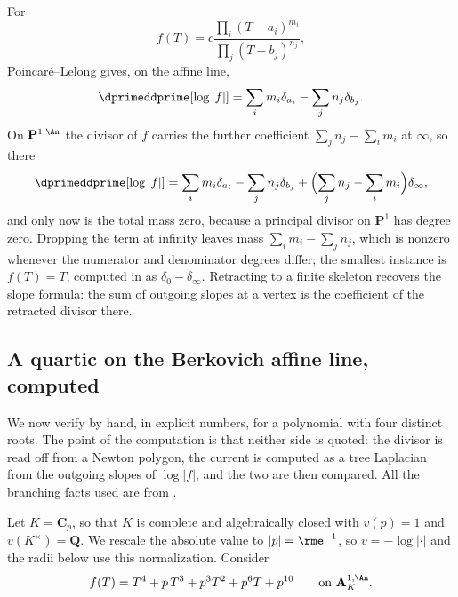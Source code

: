 \begin{example}
\label{ex:ch15-rational-p1}
For
\[
                    f(T)=c\frac{\prod_i(T-a_i)^{m_i}}
                                  {\prod_j(T-b_j)^{n_j}},
\]
Poincar\'e--Lelong gives, on the affine line,
\[
 \dprimeddprime[\log|f|]
       =\sum_i m_i\delta_{a_i}-\sum_jn_j\delta_{b_j}.
\]
On $\mathbf P^{1,\An}$ the divisor of $f$ carries the further coefficient
$\sum_jn_j-\sum_im_i$ at $\infty$, so there
\[
 \dprimeddprime[\log|f|]
       =\sum_i m_i\delta_{a_i}-\sum_jn_j\delta_{b_j}
        +\Bigl(\sum_jn_j-\sum_im_i\Bigr)\delta_\infty ,
\]
and only now is the total mass zero, because a principal divisor on
$\mathbf P^1$ has degree zero.  Dropping the term at infinity leaves mass
$\sum_im_i-\sum_jn_j$, which is nonzero whenever the numerator and
denominator degrees differ; the smallest instance is $f(T)=T$, computed in
 as $\delta_0-\delta_\infty$.  Retracting to a finite skeleton recovers the slope formula:
the sum of outgoing slopes at a vertex is the coefficient of the retracted
divisor there.
\end{example}

\subsection{A quartic on the Berkovich affine line, computed}
\label{sec:ch15-quartic}

We now verify  by hand, in explicit numbers, for
a polynomial with four distinct roots.  The point of the computation is that
neither side is quoted: the divisor is read off from a Newton polygon, the
current is computed as a tree Laplacian from the outgoing slopes of
$\log|f|$, and the two are then compared.  All the branching facts used are
from .

Let $K=\mathbf C_p$, so that $K$ is complete and algebraically closed with
$v(p)=1$ and $v(K^\times)=\mathbf Q$.  We rescale the absolute value to
$|p|=\rme^{-1}$, so $v=-\log|\cdot|$ and the radii below use this
normalization.  Consider
\begin{equation}
\label{eq:ch15-quartic}
 f(T)=T^4+p\,T^3+p^3T^2+p^6T+p^{10}
 \qquad\text{on }\mathbf A^{1,\An}_K .
\end{equation}

